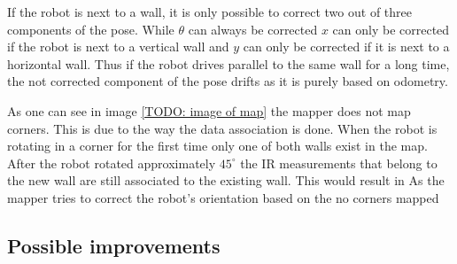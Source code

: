 If the robot is next to a wall, it is only possible to correct two out of three components of the pose. While $\theta$ can always be corrected $x$ can only be corrected if the robot is next to a vertical wall and $y$ can only be corrected if it is next to a horizontal wall. Thus if the robot drives parallel to the same wall for a long time, the not corrected component of the pose drifts as it is purely based on odometry.

As one can see in image \ref{TODO: image of map} the mapper does not map corners. This is due to the way the data association is done. When the robot is rotating in a corner for the first time only one of both walls exist in the map. After the robot rotated approximately $45^{\circ}$ the IR measurements that belong to the new wall are still associated to the existing wall. This would result in As the mapper tries to correct the robot’s orientation based on the 
no corners mapped 

\subsection{Possible improvements}